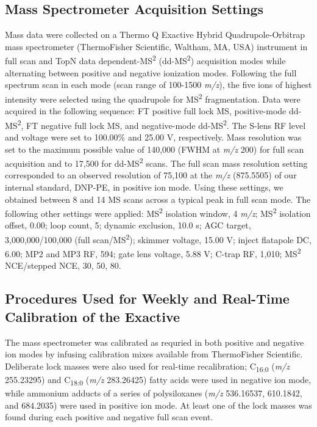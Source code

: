 \subsection{Mass Spectrometer Acquisition Settings}
\label{ssec:Mass Spectrometer Acquisition Settings}

Mass data were collected on a Thermo Q Exactive Hybrid Quadrupole-Orbitrap mass spectrometer (ThermoFisher Scientific, Waltham, MA, USA) instrument in full scan and TopN data dependent-MS\textsuperscript{2} (dd-MS\textsuperscript{2}) acquisition modes while alternating between positive and negative ionization modes. Following the full spectrum scan in each mode (scan range of 100-1500 \emph{m/z}), the five ions of highest intensity were selected using the quadrupole for MS\textsuperscript{2} fragmentation. Data were acquired in the following sequence: FT positive full lock MS, positive-mode dd-MS\textsuperscript{2}, FT negative full lock MS, and negative-mode dd-MS\textsuperscript{2}. The S-lens RF level and voltage were set to 100.00\% and 25.00 V, respectively. Mass resolution was set to the maximum possible value of 140,000 (FWHM at \emph{m/z} 200) for full scan acquisition and to 17,500 for dd-MS\textsuperscript{2} scans. The full scan mass resolution setting corresponded to an observed resolution of 75,100 at the \emph{m/z} (875.5505) of our internal standard, DNP-PE, in positive ion mode. Using these settings, we obtained between 8 and 14 MS scans across a typical peak in full scan mode. The following other settings were applied: MS\textsuperscript{2} isolation window, 4 \emph{m/z}; MS\textsuperscript{2} isolation offset, 0.00; loop count, 5; dynamic exclusion, 10.0 s; AGC target, 3,000,000/100,000 (full scan/MS\textsuperscript{2}); skimmer voltage, 15.00 V; inject flatapole DC, 6.00; MP2 and MP3 RF, 594; gate lens voltage, 5.88 V; C-trap RF, 1,010; MS\textsuperscript{2} NCE/stepped NCE, 30, 50, 80.

\subsection{Procedures Used for Weekly and Real-Time Calibration of the Exactive}

The mass spectrometer was calibrated as requried in both positive and negative ion modes by infusing calibration mixes available from ThermoFisher Scientific. Deliberate lock masses were also used for real-time recalibration; C\textsubscript{16:0} (\emph{m/z} 255.23295) and C\textsubscript{18:0} (\emph{m/z} 283.26425) fatty acids were used in negative ion mode, while ammonium adducts of a series of polysiloxanes (\emph{m/z} 536.16537, 610.1842, and 684.2035) were used in positive ion mode. At least one of the lock masses was found during each positive and negative full scan event.

